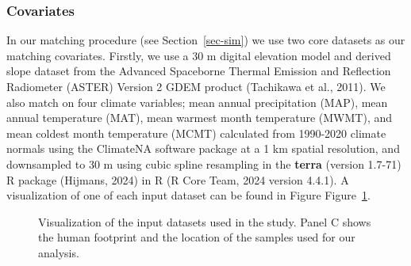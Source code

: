 \documentclass[
]{agujournal2019}
\begin{document}
\subsubsection{Covariates}\label{covariates}

In our matching procedure (see Section~\ref{sec-sim}) we use two core
datasets as our matching covariates. Firstly, we use a 30 m digital
elevation model and derived slope dataset from the Advanced Spaceborne
Thermal Emission and Reflection Radiometer (ASTER) Version 2 GDEM
product (Tachikawa et al., 2011). We also match on four climate
variables; mean annual precipitation (MAP), mean annual temperature
(MAT), mean warmest month temperature (MWMT), and mean coldest month
temperature (MCMT) calculated from 1990-2020 climate normals using the
ClimateNA software package at a 1 km spatial resolution, and downsampled
to 30 m using cubic spline resampling in the \textbf{terra} (version
1.7-71) R package (Hijmans, 2024) in R (R Core Team, 2024 version
4.4.1). A visualization of one of each input dataset can be found in
Figure Figure~\ref{fig-data}.

\label{cell-fig-data}
\begin{figure}[H]


\caption{\label{fig-data}Visualization of the input datasets used in the
study. Panel C shows the human footprint and the location of the samples
used for our analysis.}

\end{figure}%
\end{document}
